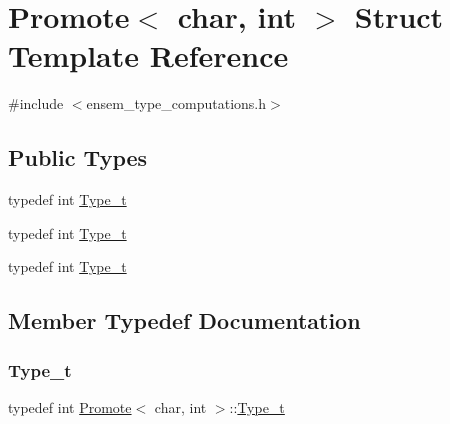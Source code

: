 \hypertarget{structPromote_3_01char_00_01int_01_4}{}\section{Promote$<$ char, int $>$ Struct Template Reference}
\label{structPromote_3_01char_00_01int_01_4}


{\ttfamily \#include $<$ensem\+\_\+type\+\_\+computations.\+h$>$}

\subsection*{Public Types}
\begin{DoxyCompactItemize}
\item 
typedef int \mbox{\hyperlink{structPromote_3_01char_00_01int_01_4_aa4465fce51bfd64e6f93b628ecbec70f}{Type\+\_\+t}}
\item 
typedef int \mbox{\hyperlink{structPromote_3_01char_00_01int_01_4_aa4465fce51bfd64e6f93b628ecbec70f}{Type\+\_\+t}}
\item 
typedef int \mbox{\hyperlink{structPromote_3_01char_00_01int_01_4_aa4465fce51bfd64e6f93b628ecbec70f}{Type\+\_\+t}}
\end{DoxyCompactItemize}


\subsection{Member Typedef Documentation}
\mbox{\label{structPromote_3_01char_00_01int_01_4_aa4465fce51bfd64e6f93b628ecbec70f}} 
\subsubsection{\texorpdfstring{Type\_t}{Type\_t}\hspace{0.1cm}{\footnotesize\ttfamily [1/3]}}
{\footnotesize\ttfamily typedef int \mbox{\hyperlink{structPromote}{Promote}}$<$ char, int $>$\+::\mbox{\hyperlink{structPromote_3_01char_00_01int_01_4_aa4465fce51bfd64e6f93b628ecbec70f}{Type\+\_\+t}}}

\mbox{\label{structPromote_3_01char_00_01int_01_4_aa4465fce51bfd64e6f93b628ecbec70f}} 
